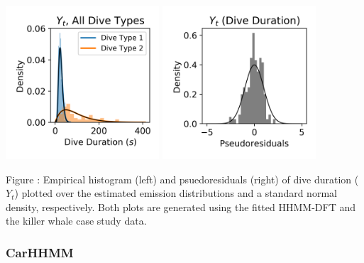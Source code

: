\documentclass{article}
\begin{document}
        \begin{center}
        \includegraphics[width=2.25in]{../Plots/HHMM_empirical_hist_dive_duration.png}
        \includegraphics[width=2.25in]{../Plots/HHMM_psedoresids_Dive_Duration.png}
        \end{center}
        
        \noindent Figure : Empirical histogram (left) and psuedoresiduals (right) of dive duration ($Y_{t}$) plotted over the estimated emission distributions and a standard normal density, respectively. Both plots are generated using the fitted HHMM-DFT and the killer whale case study data.
        \addtocounter{fignum}{1}
        
        \subsubsection{CarHHMM}
        
\end{document}
